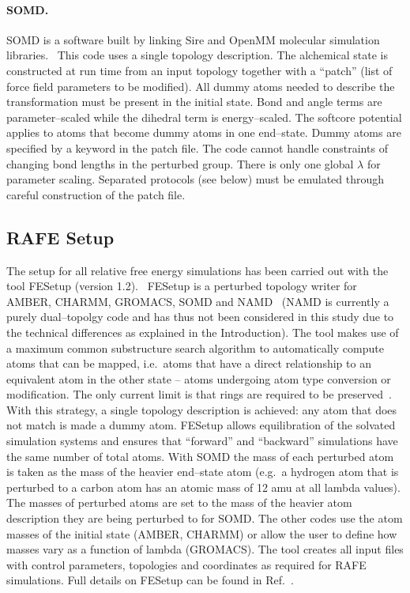 \documentclass[journal=jctcce,manuscript=article]{achemso}
\begin{document}
\paragraph{SOMD.} SOMD is a software built by linking  Sire
and OpenMM molecular simulation libraries.~\cite{Sire-2016,doi:10.1021/ct300857j}
This code uses a single topology description.
The alchemical state is constructed at run time from an input topology together with
a ``patch'' (list of force field parameters to be modified).  All dummy atoms
needed to describe the transformation must be present in the initial state.
Bond and angle terms are parameter--scaled while the dihedral term is
energy--scaled.  The softcore potential applies to atoms that become dummy atoms
in one end--state.  Dummy atoms are specified by a keyword in the patch file.
The code cannot handle constraints of changing bond lengths in the
perturbed group.  There is only one global $\lambda$ for parameter
scaling.  Separated protocols (see below) must be emulated through
careful construction of the patch file.


\subsection{RAFE Setup}
\label{sec:rafe_setup}

The setup for all relative free energy simulations has been carried
out with the tool FESetup (version 1.2).~\cite{loeffler_fesetup:_2015}
FESetup is a perturbed topology writer for AMBER, CHARMM,
GROMACS, SOMD and NAMD~\cite{JCC:JCC20289} (NAMD is currently a purely
dual--topolgy code and has thus not been considered in this study due
to the technical differences as explained in the Introduction).  The
tool makes use of a maximum common substructure search algorithm to
automatically compute
atoms that can be mapped, i.e.\ atoms that have a direct relationship
to an equivalent atom in the other state -- atoms undergoing atom type conversion or modification.  The only current limit is that rings are
required to be preserved~\cite{doi:10.1021/acs.jcim.5b00057}.  With this
strategy, a single topology description is achieved: any atom that
does not match is made a dummy atom.  FESetup allows
equilibration of the solvated simulation systems and ensures that
``forward'' and ``backward'' simulations have the same number of
total atoms.  With SOMD the mass of each perturbed atom is taken as the mass of the heavier end--state atom (e.g.\ a hydrogen atom that is perturbed to a carbon atom has an atomic mass of 12 amu at all lambda values).  The masses of perturbed atoms are set to the mass of the heavier atom description they are being perturbed to for SOMD.  The other codes use the atom masses of the initial state (AMBER, CHARMM) or allow the user to define how masses vary as a function of lambda (GROMACS).
The tool creates all input files with control
parameters, topologies and coordinates as required for RAFE
simulations.  Full details on FESetup can be found in
Ref.~.
\end{document}
